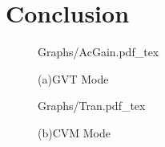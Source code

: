 \documentclass{article}
\begin{document}
\section{Conclusion}
\label{sec:conclusion}


\begin{figure}[!hb]
    \begin{minipage}[b]{0.1\linewidth}
            \centering
            \def\svgwidth{7cm}
            \fontsize{8}{15}\selectfont
             {Graphs/AcGain.pdf_tex}
            \fontsize{8}{10}\selectfont
            \centerline{(a)GVT Mode }\medskip
    \end{minipage}
    \hspace*{\fill}
    \begin{minipage}[!htb]{0.1\linewidth}
        \centering
        \def\svgwidth{7cm}
        \fontsize{4}{6}\selectfont
         {Graphs/Tran.pdf_tex}
        \fontsize{4}{6}\selectfont
        \centerline{(b)CVM Mode }\medskip
    \end{minipage}
    \caption{}
    \label{fig:res}
\end{figure}

%
%
%
%

%

%
\end{document}

